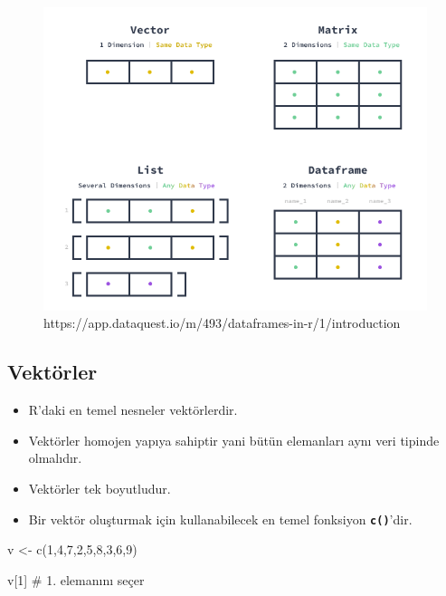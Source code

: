 \documentclass[
  letterpaper,
  DIV=11,
  numbers=noendperiod]{scrreprt}
\newenvironment{Shaded}{\begin{snugshade}}{\end{snugshade}}
\newcommand{\CommentTok}[1]{\textcolor[rgb]{0.37,0.37,0.37}{#1}}
\newcommand{\DecValTok}[1]{\textcolor[rgb]{0.68,0.00,0.00}{#1}}
\newcommand{\FunctionTok}[1]{\textcolor[rgb]{0.28,0.35,0.67}{#1}}
\newcommand{\NormalTok}[1]{\textcolor[rgb]{0.00,0.23,0.31}{#1}}
\newcommand{\OtherTok}[1]{\textcolor[rgb]{0.00,0.23,0.31}{#1}}
\begin{document}
\begin{figure}

{\centering \includegraphics{images/data_structures.png}

}

\caption{https://app.dataquest.io/m/493/dataframes-in-r/1/introduction}

\end{figure}

\hypertarget{vektuxf6rler}{%
\subsection{Vektörler}\label{vektuxf6rler}}

\begin{itemize}
\item
  R'daki en temel nesneler vektörlerdir.
\item
  Vektörler homojen yapıya sahiptir yani bütün elemanları aynı veri
  tipinde olmalıdır.
\item
  Vektörler tek boyutludur.
\item
  Bir vektör oluşturmak için kullanabilecek en temel fonksiyon
  \textbf{\texttt{c()}}'dir.
\end{itemize}

\begin{Shaded}
\begin{Highlighting}[]
\NormalTok{v }\OtherTok{\textless{}{-}} \FunctionTok{c}\NormalTok{(}\DecValTok{1}\NormalTok{,}\DecValTok{4}\NormalTok{,}\DecValTok{7}\NormalTok{,}\DecValTok{2}\NormalTok{,}\DecValTok{5}\NormalTok{,}\DecValTok{8}\NormalTok{,}\DecValTok{3}\NormalTok{,}\DecValTok{6}\NormalTok{,}\DecValTok{9}\NormalTok{)}

\NormalTok{v[}\DecValTok{1}\NormalTok{] }\CommentTok{\# 1. elemanını seçer}
\end{Highlighting}
\end{Shaded}
\end{document}
